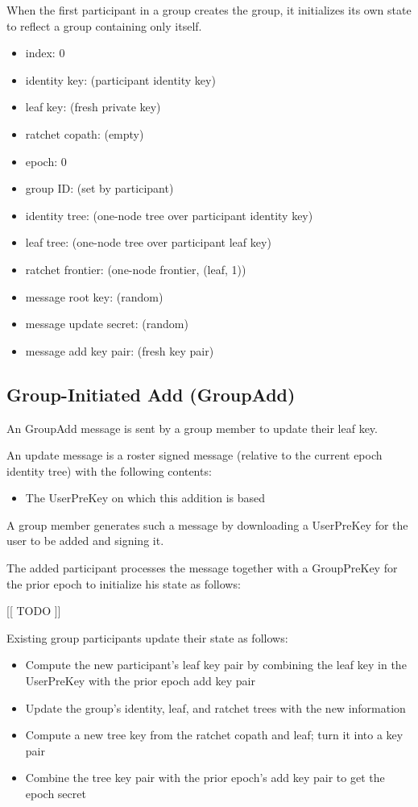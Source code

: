 \documentclass[11pt, oneside]{article}
\begin{document}
When the first participant in a group creates the group, it initializes its own state to reflect a group containing only itself.

\begin{itemize}
\item{index: 0}
\item{identity key: (participant identity key)}
\item{leaf key: (fresh private key)}
\item{ratchet copath: (empty)}
\item{epoch: 0}
\item{group ID: (set by participant)}
\item{identity tree: (one-node tree over participant identity key)}
\item{leaf tree: (one-node tree over participant leaf key)}
\item{ratchet frontier: (one-node frontier, (leaf, 1))}
\item{message root key: (random)}
\item{message update secret: (random)}
\item{message add key pair: (fresh key pair)}
\end{itemize}


\subsection{Group-Initiated Add (GroupAdd)}

An GroupAdd message is sent by a group member to update their leaf key.  

An update message is a roster signed message (relative to the current epoch identity tree) with the following contents:

\begin{itemize}
\item{The UserPreKey on which this addition is based}
\end{itemize}

A group member generates such a message by downloading a UserPreKey for the user to be added and signing it.

The added participant processes the message together with a GroupPreKey for the prior epoch to initialize his state as follows:

[[ TODO ]]

Existing group participants update their state as follows:

\begin{itemize}
\item{Compute the new participant's leaf key pair by combining the leaf key in the UserPreKey with the prior epoch add key pair}
\item{Update the group's identity, leaf, and ratchet trees with the new information}
\item{Compute a new tree key from the ratchet copath and leaf; turn it into a key pair}
\item{Combine the tree key pair with the prior epoch's add key pair to get the epoch secret}
\end{itemize}
\end{document}
